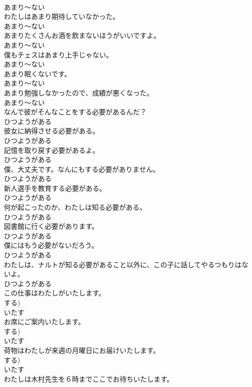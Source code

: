 \documentclass[8pt]{extreport}
\begin{document}
\begin{CJK}{UTF8}{min}
\\	あまり～ない
\\	わたしはあまり期待していなかった。	
\\	あまり～ない
\\	あまりたくさんお酒を飲まないほうがいいですよ。	
\\	あまり～ない
\\	僕もチェスはあまり上手じゃない。	
\\	あまり～ない
\\	あまり眠くないです。	
\\	あまり～ない
\\	あまり勉強しなかったので、成績が悪くなった。	
\\	あまり～ない
\\	なんで彼がそんなことをする必要があるんだ？	
\\	ひつようがある
\\	彼女に納得させる必要がある。	
\\	ひつようがある
\\	記憶を取り戻す必要があるよ。	
\\	ひつようがある
\\	僕、大丈夫です。なんにもする必要がありません。	
\\	ひつようがある
\\	新人選手を教育する必要がある。	
\\	ひつようがある
\\	何が起こったのか、わたしは知る必要がある。	
\\	ひつようがある
\\	図書館に行く必要があります。	
\\	ひつようがある
\\	僕にはもう必要がないだろう。	
\\	ひつようがある
\\	わたしは、ナルトが知る必要があること以外に、この子に話してやるつもりはないよ。	
\\	ひつようがある
\\	この仕事はわたしがいたします。	
\\	する)	
\\	いたす
\\	お席にご案内いたします。	
\\	する)	
\\	いたす
\\	荷物はわたしが来週の月曜日にお届けいたします。	
\\	する)	
\\	いたす
\\	わたしは木村先生を６時までここでお待ちいたします。	

\end{CJK}
\end{document}
